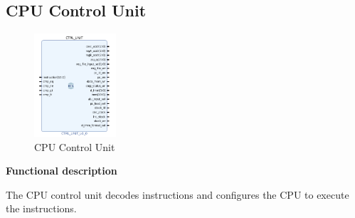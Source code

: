 \documentclass{article}
\begin{document}
\begin{par}
	\newpage
	
	\subsection{CPU Control Unit}
	
	\begin{figure}[H]
		\centering
		\includegraphics[width=1.2in]{img/ctrlUnit.png}
		\caption{CPU Control Unit}
	\end{figure}
	
	\textbf{Functional description}
	\begin{par}
		The CPU control unit decodes instructions and configures the CPU to execute the instructions. 
	\end{par}
	

\end{par}
\end{document}
